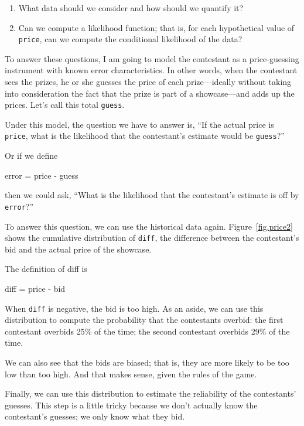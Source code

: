 \documentclass[12pt]{book}
\theoremstyle{exercise}
\begin{document}
\begin{enumerate}

\item What data should we consider and how should we quantify it?

\item Can we compute a likelihood function; that is,
  for each hypothetical value of {\tt price}, can we compute
  the conditional likelihood of the data?

\end{enumerate}

To answer these questions, I am going to model the contestant
as a price-guessing instrument with known error characteristics.
In other words, when the contestant sees the prizes, he or she
guesses the price of each prize---ideally without taking into
consideration the fact that the prize is part of a showcase---and
adds up the prices.  Let's call this total {\tt guess}.

Under this model, the question we have to answer is, ``If the
actual price is {\tt price}, what is the likelihood that the
contestant's estimate would be {\tt guess}?''

Or if we define
%
\begin{code}
    error = price - guess
\end{code}
%
then we could ask, ``What is the likelihood
that the contestant's estimate is off by {\tt error}?''

To answer this question, we can use the historical data again.
Figure~\ref{fig.price2} shows the cumulative distribution of {\tt diff},
the difference between the contestant's bid and the actual price
of the showcase.

The definition of diff is
%
\begin{code}
    diff = price - bid
\end{code}
%
When {\tt diff} is negative, the bid is too high.  As an
aside, we can use this distribution to compute the probability that the
contestants overbid: the first contestant overbids 25\% of the
time; the second contestant overbids 29\% of the time.

We can also see that the bids are biased;
that is, they are more likely to be too low than too high.  And
that makes sense, given the rules of the game.

Finally, we can use this distribution to estimate the reliability of
the contestants' guesses.  This step is a little tricky because
we don't actually know the contestant's guesses; we only know
what they bid.
\end{document}
